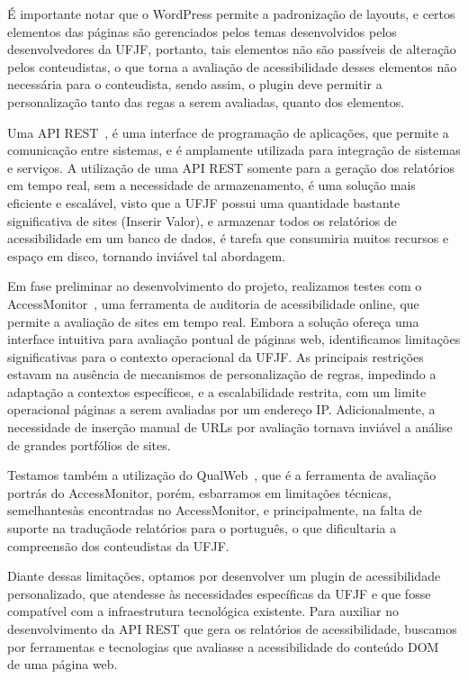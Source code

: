 \documentclass[12pt]{article}
\begin{document}
É importante notar que o WordPress permite a padronização de layouts,
e certos elementos das páginas são gerenciados pelos temas desenvolvidos pelos
desenvolvedores da UFJF, portanto, tais elementos não são passíveis de alteração
pelos conteudistas, o que torna a avaliação de acessibilidade desses elementos
não necessária para o conteudista, sendo assim, o plugin deve permitir a
personalização tanto das regas a serem avaliadas, quanto dos elementos.

Uma API REST~\autocite{api}, é uma interface de programação de aplicações, que
permite a comunicação entre sistemas, e é amplamente utilizada para integração
de sistemas e serviços. A utilização de uma API REST somente para a geração
dos relatórios em tempo real, sem a necessidade de armazenamento, é uma
solução mais eficiente e escalável, visto que a UFJF possui uma quantidade
bastante significativa de sites (Inserir Valor), e armazenar todos os
relatórios de acessibilidade em um banco de dados, é tarefa que consumiria
muitos recursos e espaço em disco, tornando inviável tal abordagem.

Em fase preliminar ao desenvolvimento do projeto, realizamos testes com o
AccessMonitor~\autocite{AM},
uma ferramenta de auditoria de acessibilidade online, que permite a avaliação de
sites em tempo real. Embora a solução ofereça uma interface intuitiva para
avaliação pontual de páginas web, identificamos limitações significativas para o
contexto operacional da UFJF. As principais restrições estavam na ausência de
mecanismos de personalização de regras, impedindo a adaptação a contextos
específicos, e a escalabilidade restrita, com um limite operacional páginas a
serem avaliadas por um endereço IP\@. Adicionalmente, a necessidade de inserção
manual de URLs por avaliação tornava inviável a análise de grandes portfólios de
sites\@.

Testamos também a utilização do QualWeb~\autocite{qualweb}, que é a ferramenta
de avaliação portrás do AccessMonitor, porém, esbarramos em limitações técnicas,
semelhantesàs encontradas no AccessMonitor, e principalmente, na falta de suporte
na traduçãode relatórios para o português, o que dificultaria a compreensão dos
conteudistas da UFJF\@.

Diante dessas limitações, optamos por desenvolver um plugin de acessibilidade
personalizado, que atendesse às necessidades específicas da UFJF e que fosse
compatível com a infraestrutura tecnológica existente. Para auxiliar no
desenvolvimento da API REST que gera os relatórios de acessibilidade,
buscamos por ferramentas e tecnologias que avaliasse a acessibilidade
do conteúdo DOM~\autocite{DOM} de uma página web.
\end{document}
